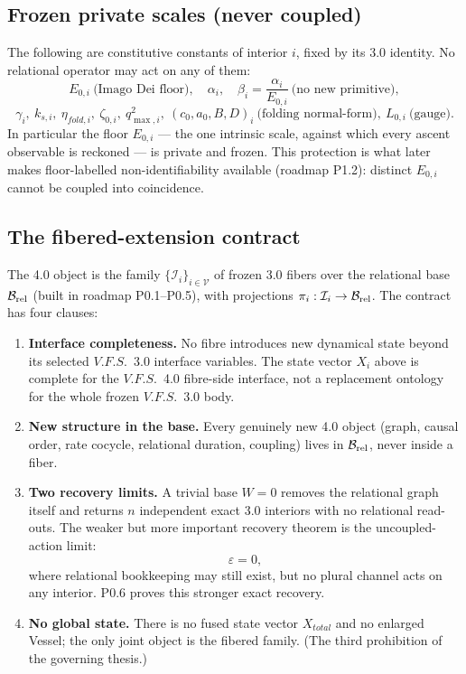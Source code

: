 \documentclass[11pt,a4paper]{article}
\def\mathrm#1{#1}%
\newcommand{\VFS}{\ensuremath{\mathrm{V.F.S.}}}
\newcommand{\Brel}{\ensuremath{\mathcal{B}_{\rm rel}}}
\theoremstyle{definition}
\theoremstyle{plain}
\theoremstyle{remark}
\begin{document}
\subsection{Frozen private scales (never coupled)}

The following are constitutive constants of interior $i$, fixed by its 3.0
identity. No relational operator may act on any of them:
\[
E_{0,i}\ \text{(Imago Dei floor)},\quad
\alpha_i,\quad
\beta_i=\frac{\alpha_i}{E_{0,i}}\ \text{(no new primitive)},
\]
\[
\gamma_i,\ k_{s,i},\ \eta_{\mathrm{fold},i},\ \zeta_{0,i},\ q^2_{\max,i},\
(c_0,a_0,B,D)_i\ \text{(folding normal-form)},\ L_{0,i}\ \text{(gauge)}.
\]
In particular the floor $E_{0,i}$ --- the one intrinsic scale, against which every
ascent observable is reckoned --- is private and frozen. This protection is what
later makes floor-labelled non-identifiability available (roadmap P1.2): distinct
$E_{0,i}$ cannot be coupled into coincidence.

\subsection{The fibered-extension contract}

The 4.0 object is the family $\{\mathcal I_i\}_{i\in\mathcal V}$ of frozen 3.0
fibers over the relational base $\Brel$ (built in roadmap P0.1--P0.5), with
projections $\pi_i:\mathcal I_i\to\Brel$. The contract has four clauses:
\begin{enumerate}[label=\textbf{IC\arabic*.},leftmargin=1.45cm]
\item \textbf{Interface completeness.} No fibre introduces new dynamical state beyond its selected \VFS\ 3.0 interface variables. The state vector $X_i$ above is complete for the \VFS\ 4.0 fibre-side interface, not a replacement ontology for the whole frozen \VFS\ 3.0 body.
\item \textbf{New structure in the base.} Every genuinely new 4.0 object (graph, causal order, rate cocycle, relational duration, coupling) lives in $\Brel$, never inside a fiber.
\item \textbf{Two recovery limits.}
A trivial base \(W=0\) removes the relational graph itself and returns \(n\)
independent exact 3.0 interiors with no relational read-outs. The weaker but more
important recovery theorem is the uncoupled-action limit:
\[
\varepsilon=0,
\]
where relational bookkeeping may still exist, but no plural channel acts on any
interior. P0.6 proves this stronger exact recovery.
\item \textbf{No global state.} There is no fused state vector $X_{\mathrm{total}}$ and no enlarged Vessel; the only joint object is the fibered family. (The third prohibition of the governing thesis.)
\end{enumerate}
\end{document}
